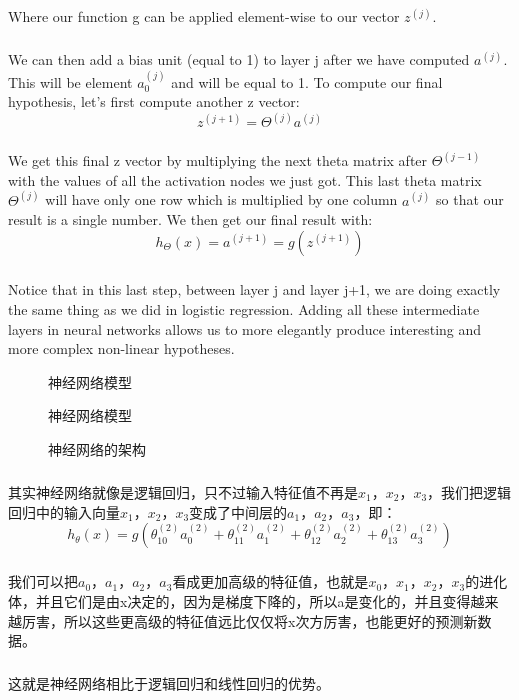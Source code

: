 \documentclass{article}
\begin{document}
\begin{CJK}{UTF8}{gbsn}
\begin{equation}
\end{equation}
\subparagraph{}
Where our function g can be applied element-wise to our vector $z^{(j)}$.
\subparagraph{}
We can then add a bias unit (equal to 1) to layer j after we have computed $a^{(j)}$. This will be element $a_0^{(j)}$ and will be equal to 1. To compute our final hypothesis, let's first compute another z vector:
\begin{equation}
z^{(j+1)}=\Theta^{(j)}a^{(j)}
\end{equation}
\subparagraph{}
We get this final z vector by multiplying the next theta matrix after $\Theta^{(j-1)}$ with the values of all the activation nodes we just got. This last theta matrix $\Theta^{(j)}$ will have only one row which is multiplied by one column $a^{(j)}$ so that our result is a single number. We then get our final result with:
\begin{equation}
h_\Theta(x)=a^{(j+1)}=g(z^{(j+1)})
\end{equation}
\subparagraph{}
Notice that in this last step, between layer j and layer j+1, we are doing exactly the same thing as we did in logistic regression. Adding all these intermediate layers in neural networks allows us to more elegantly produce interesting and more complex non-linear hypotheses.
\begin{figure}[H]
\caption{神经网络模型}
\label{fig:416}
\end{figure}
\begin{figure}[H]
\caption{神经网络模型}
\label{fig:417}
\end{figure}
\begin{figure}[H]
\caption{神经网络的架构}
\label{fig:418}
\end{figure}
\subparagraph{}
其实神经网络就像是逻辑回归，只不过输入特征值不再是$x_1$，$x_2$，$x_3$，我们把逻辑回归中的输入向量$x_1$，$x_2$，$x_3$变成了中间层的$a_1$，$a_2$，$a_3$，即：
\begin{equation}
h_\theta(x)=g(\theta_{10}^{(2)}a_0^{(2)}+\theta_{11}^{(2)}a_1^{(2)}+\theta_{12}^{(2)}a_2^{(2)}+\theta_{13}^{(2)}a_3^{(2)})
\end{equation}
\subparagraph{}
我们可以把$a_0$，$a_1$，$a_2$，$a_3$看成更加高级的特征值，也就是$x_0$，$x_1$，$x_2$，$x_3$的进化体，并且它们是由x决定的，因为是梯度下降的，所以a是变化的，并且变得越来越厉害，所以这些更高级的特征值远比仅仅将x次方厉害，也能更好的预测新数据。
\subparagraph{}
这就是神经网络相比于逻辑回归和线性回归的优势。

\end{CJK}
\end{document}
